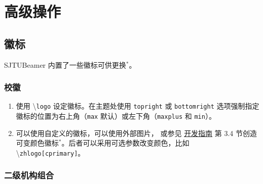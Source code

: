 \documentclass[
    UTF8,
    heading=true,
    12pt,
    a4paper
]{ctexrep}
\newenvironment{commentlist}
{\begin{enumerate}\small}
{\end{enumerate}}
\newcommand{\cmd}[1]{\textbackslash{}\texttt{#1}}
\newcommand{\opt}[1]{\texttt{#1}}
\def\themename{\textsf{SJTUBeamer}}
\begin{document}
\part{高级操作}
\chapter{徽标}

\themename{} 内置了一些徽标可供更换$^*$。

\section{校徽}

\begin{tcbitemize}[raster rows=2, raster
    columns=3, raster every box/.style={
        center title,
        valign=center,
        halign=center,
        fonttitle=\ttfamily,
        colback=white}]
  \tcbitem[raster multicolumn=2,blankest]
  \begin{tcbitemize}[raster columns=2]
    \tcbitem[title={\cmd{zhlogo}}]
    \hbox{\resizebox{!}{1cm}{\zhlogo}}

    \tcbitem[title={\cmd{enlogo}}]
    \hbox{\resizebox{!}{1cm}{\enlogo}}

    \tcbitem[title={\cmd{sjtubadge}},height=3.5cm]
    \resizebox{!}{2cm}{\sjtubadge{}}

    \tcbitem[title={\cmd{dlogo}},height=3.5cm]
    \resizebox{3cm}{!}{\dlogo{}}
  \end{tcbitemize}
  \tcbitem[title={\cmd{vlogo}}]
  \resizebox{!}{4.8cm}{\vlogo{}}
\end{tcbitemize}


\begin{commentlist}
  \item 使用 \cmd{logo} 设定徽标。在主题处使用 \opt{topright}
  或 \opt{bottomright} 选项强制指定徽标的位置为右上角（\opt{max}
  默认）或左下角（\opt{maxplus} 和 \opt{min}）。
  \item 可以使用自定义的徽标，可以使用外部图片，
  或参见 \href{run:sjtubeamerdevguide.pdf}{开发指南}
  第 3.4 节创造可变颜色徽标$^*$。后者可以采用可选参数改变颜色，比如
  \cmd{zhlogo[cprimary]}。
\end{commentlist}

\section{二级机构组合}
\end{document}
